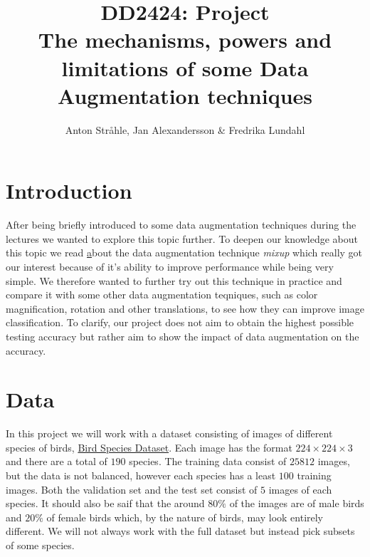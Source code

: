 \documentclass{article}
\begin{document}
\title{DD2424: Project \\
The mechanisms, powers and limitations of some Data Augmentation techniques}

\author{Anton Stråhle, Jan Alexandersson \& Fredrika Lundahl}
\maketitle 

\section{Introduction}

After being briefly introduced to some data augmentation techniques during the lectures we wanted to explore this topic further. 
To deepen our knowledge about this topic we read \href{https://arxiv.org/pdf/1710.09412.pdf} about the data augmentation technique \textit{mixup} which 
really got our interest because of it's ability to improve performance while being very simple. We therefore wanted to further try out this technique 
in practice and compare it with some other data augmentation teqniques, such as color magnification, rotation and other translations, to see how they can improve 
image classification. To clarify, our project does not aim to obtain the highest possible testing accuracy but rather aim to show the impact of data augmentation 
on the accuracy. 

\section{Data}

In this project we will work with a dataset consisting of images of different species of birds, 
\href{https://www.kaggle.com/gpiosenka/100-bird-species}{Bird Species Dataset}. Each image has the format $224 \times 224 \times 3$ and there are 
a total of $190$ species. The training data consist of $25812$ images, but the data is not balanced, however each species has a least $100$ training images. 
Both the validation set and the test set consist of $5$ images of each species. 
It should also be saif that the around $80\%$ of the images are of male birds and $20\%$ of female 
birds which, by the nature of birds, may look entirely different. 
We will not always work with the full dataset but instead pick subsets of some species. 
\end{document}
